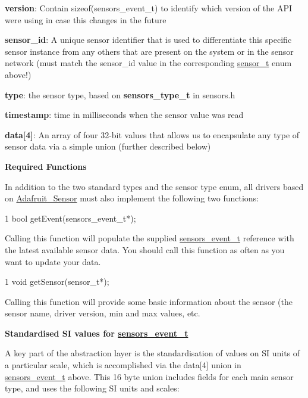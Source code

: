 \begin{DoxyItemize}
\item {\bfseries version}\+: Contain \textquotesingle{}sizeof(sensors\+\_\+event\+\_\+t)\textquotesingle{} to identify which version of the A\+PI we\textquotesingle{}re using in case this changes in the future
\item {\bfseries sensor\+\_\+id}\+: A unique sensor identifier that is used to differentiate this specific sensor instance from any others that are present on the system or in the sensor network (must match the sensor\+\_\+id value in the corresponding \hyperlink{_adafruit___sensor_8h_structsensor__t}{sensor\+\_\+t} enum above!)
\item {\bfseries type}\+: the sensor type, based on {\bfseries sensors\+\_\+type\+\_\+t} in sensors.\+h
\item {\bfseries timestamp}\+: time in milliseconds when the sensor value was read
\item {\bfseries data\mbox{[}4\mbox{]}}\+: An array of four 32-\/bit values that allows us to encapsulate any type of sensor data via a simple union (further described below)
\end{DoxyItemize}

{\bfseries Required Functions}

In addition to the two standard types and the sensor type enum, all drivers based on \hyperlink{class_adafruit___sensor}{Adafruit\+\_\+\+Sensor} must also implement the following two functions\+:


\begin{DoxyCode}
1 bool getEvent(sensors\_event\_t*);
\end{DoxyCode}
 Calling this function will populate the supplied \hyperlink{_adafruit___sensor_8h_structsensors__event__t}{sensors\+\_\+event\+\_\+t} reference with the latest available sensor data. You should call this function as often as you want to update your data.


\begin{DoxyCode}
1 void getSensor(sensor\_t*);
\end{DoxyCode}
 Calling this function will provide some basic information about the sensor (the sensor name, driver version, min and max values, etc.

{\bfseries Standardised SI values for \hyperlink{_adafruit___sensor_8h_structsensors__event__t}{sensors\+\_\+event\+\_\+t}}

A key part of the abstraction layer is the standardisation of values on SI units of a particular scale, which is accomplished via the data\mbox{[}4\mbox{]} union in \hyperlink{_adafruit___sensor_8h_structsensors__event__t}{sensors\+\_\+event\+\_\+t} above. This 16 byte union includes fields for each main sensor type, and uses the following SI units and scales\+:


